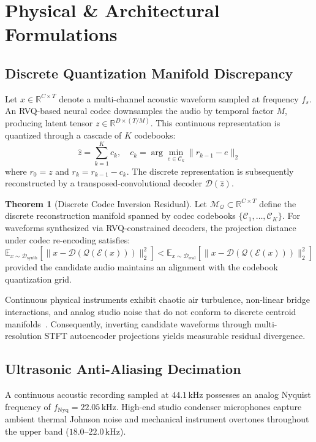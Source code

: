 \documentclass[conference]{IEEEtran}
\theoremstyle{definition}
\newtheorem{theorem}{Theorem}
\begin{document}
\section{Physical & Architectural Formulations}

\subsection{Discrete Quantization Manifold Discrepancy}
Let $x \in \mathbb{R}^{C \times T}$ denote a multi-channel acoustic waveform sampled at frequency $f_s$. An RVQ-based neural codec downsamples the audio by temporal factor $M$, producing latent tensor $z \in \mathbb{R}^{D \times (T/M)}$. This continuous representation is quantized through a cascade of $K$ codebooks:
\begin{equation}
\hat{z} = \sum_{k=1}^K c_k, \quad c_k = \arg\min_{e \in \mathcal{C}_k} \| r_{k-1} - e \|_2
\end{equation}
where $r_0 = z$ and $r_k = r_{k-1} - c_k$. The discrete representation is subsequently reconstructed by a transposed-convolutional decoder $\mathcal{D}(\hat{z})$.

\begin{theorem}[Discrete Codec Inversion Residual]
Let $\mathcal{M}_{\mathcal{Q}} \subset \mathbb{R}^{C \times T}$ define the discrete reconstruction manifold spanned by codec codebooks $\{\mathcal{C}_1, \dots, \mathcal{C}_K\}$. For waveforms synthesized via RVQ-constrained decoders, the projection distance under codec re-encoding satisfies:
\begin{equation}
\mathbb{E}_{x \sim \mathcal{D}_{\text{synth}}}\left[ \| x - \mathcal{D}(\mathcal{Q}(\mathcal{E}(x))) \|_2^2 \right] < \mathbb{E}_{x \sim \mathcal{D}_{\text{real}}}\left[ \| x - \mathcal{D}(\mathcal{Q}(\mathcal{E}(x))) \|_2^2 \right]
\end{equation}
provided the candidate audio maintains an alignment with the codebook quantization grid.
\end{theorem}

Continuous physical instruments exhibit chaotic air turbulence, non-linear bridge interactions, and analog studio noise that do not conform to discrete centroid manifolds~\cite{fletcher2012physics}. Consequently, inverting candidate waveforms through multi-resolution STFT autoencoder projections yields measurable residual divergence.

\subsection{Ultrasonic Anti-Aliasing Decimation}
A continuous acoustic recording sampled at $44.1$\,kHz possesses an analog Nyquist frequency of $f_{\text{Nyq}} = 22.05$\,kHz. High-end studio condenser microphones capture ambient thermal Johnson noise and mechanical instrument overtones throughout the upper band ($18.0\text{--}22.0$\,kHz).
\end{document}
